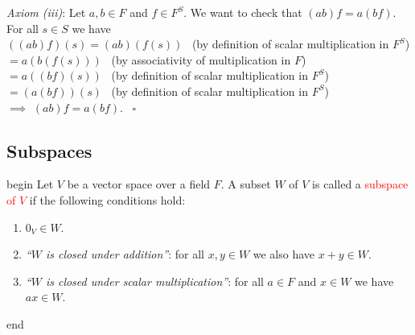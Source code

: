 \documentclass[
  12pt,
  a4paper,
  twoside]{article}
\providecommand{\tightlist}{%
  \setlength{\itemsep}{0pt}\setlength{\parskip}{0pt}}
\theoremstyle{plain}
\theoremstyle{definition}
\begin{document}
\emph{Axiom (iii)}: Let \(a,b\in F\) and \(f\in F^S\). We want to check that \((ab)f = a(bf)\).\\
For all \(s\in S\) we have\\
\(((ab)f)(s) = (ab)(f(s))\) \hfill~{(by definition of scalar multiplication in \(F^S\))}\\
\hspace*{0.333em}\hspace*{0.333em}\hspace*{0.333em}\hspace*{0.333em} \(=a(b(f(s)))\) \hfill~{(by associativity of multiplication in \(F\))}\\
\hspace*{0.333em}\hspace*{0.333em}\hspace*{0.333em}\hspace*{0.333em} \(=a((bf)(s))\) \hfill~{(by definition of scalar multiplication in \(F^S\))}\\
\hspace*{0.333em}\hspace*{0.333em}\hspace*{0.333em}\hspace*{0.333em} \(=(a(bf))(s)\) \hfill~{(by definition of scalar multiplication in \(F^S\))}\\
\(\implies\) \((ab)f = a(bf)\). \hfill~{\(\square\)}

\hypertarget{ss-subspaces}{%
\subsection{Subspaces}\label{ss-subspaces}}

\csname begin\label{cnj:defn-subspace}
Let \(V\) be a vector space over a field \(F\). A subset \(W\) of \(V\) is called a \textcolor{red}{subspace of $V$} if the following conditions hold:

\begin{enumerate}
\def\labelenumi{(\alph{enumi})}
\tightlist
\item
  \(0_{V} \in W\).
\item
  \emph{``\(W\) is closed under addition''}: for all \(x,y \in W\) we also have \(x+y \in W\).
\item
  \emph{``\(W\) is closed under scalar multiplication''}: for all \(a \in F\) and \(x \in W\) we have \(ax \in W\).
\end{enumerate}

\csname end
\end{document}
